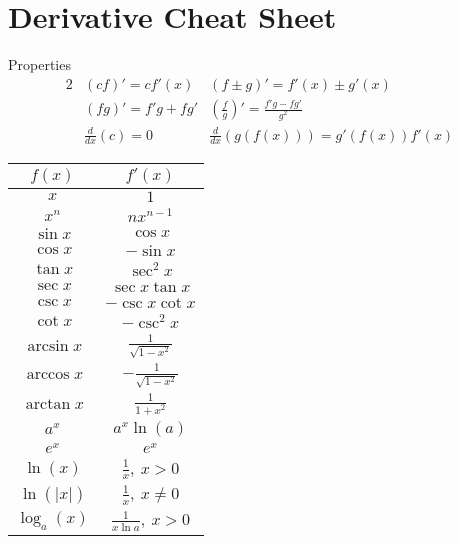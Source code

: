 \documentclass[8pt,a4paper,twocolumn,table]{extarticle}
\begin{document}
\section{Derivative Cheat Sheet}

Properties
\begin{alignat*}{2}
     & (cf)' = c f'(x)     & (f \pm g)' = f'(x) \pm g'(x)                       \\
     & (fg)' = f'g + fg'   & (\frac{f}{g})' = \frac{f'g - fg'}{g^2}             \\
     & \frac{d}{dx}(c) = 0 & \frac{d}{dx}\left( g(f(x)) \right) = g'(f(x))f'(x)
\end{alignat*}

\begin{tabular}{|c | c |}
    \hline
    \rowcolor{lightgray} $f(x)$ & $f'(x)$                       \\
    \hline
    $x$                         & $1$                           \\
    \hline
    $x^n$                       & $nx^{n-1}$                    \\
    \hline
    $\sin x$                    & $\cos x$                      \\
    \hline
    $ \cos x $                  & $ -\sin x $                   \\
    \hline
    $ \tan x $                  & $ \sec^2 x $                  \\
    \hline
    $ \sec x $                  & $ \sec x \tan x $             \\
    \hline
    $ \csc x $                  & $ -\csc x \cot x$             \\
    \hline
    $ \cot x $                  & $ -\csc^2 x $                 \\
    \hline
    $ \arcsin x$                & $ \frac{1}{\sqrt{1 - x^2}} $  \\
    \hline
    $ \arccos x$                & $ -\frac{1}{\sqrt{1 - x^2}} $ \\
    \hline
    $ \arctan x$                & $ \frac{1}{1 + x^2} $         \\
    \hline
    $ a^x $                     & $ a^x \ln(a) $                \\
    \hline
    $ e^x $                     & $ e^x $                       \\
    \hline
    $ \ln(x) $                  & $ \frac{1}{x},\ x > 0 $       \\
    \hline
    $ \ln(|x|) $                & $ \frac{1}{x},\ x \ne 0 $     \\
    \hline
    $ \log_a(x) $               & $ \frac{1}{x \ln a},\ x > 0 $ \\
\end{tabular}
\end{document}
